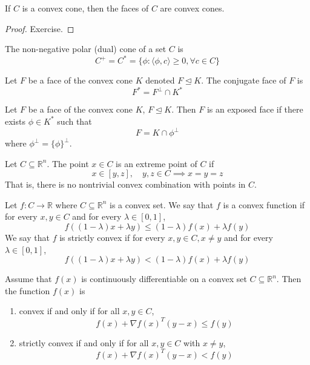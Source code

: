 \begin{theorem}[]
    If $C$ is a convex cone, then the faces of $C$ are convex cones.
\end{theorem}
\begin{proof}[Proof]
    Exercise.
\end{proof}
\begin{definition}
    The non-negative polar (dual) cone of a set $C$ is
    $$C^+ = C^* = \{\phi : \langle \phi, c \rangle \geq 0, \forall c \in C\}$$
\end{definition}
\begin{definition}
    Let $F$ be a face of the convex cone $K$ denoted $F \unlhd K$. The conjugate face of $F$ is $$F^* = F^\bot \cap K^*$$
\end{definition}
\begin{definition}
    Let $F$ be a face of the convex cone $K$, $F \unlhd K$. Then $F$ is an exposed face if there exists $\phi \in K^*$ such that
    $$F = K \cap \phi^\bot$$
    where $\phi^\bot = \{\phi\}^\bot$.
\end{definition}
\begin{definition}
    Let $C \subseteq \mathbb R^n$. The point $x \in C$ is an extreme point of $C$ if
    $$x \in [y,z], \quad y, z \in C \implies x = y = z$$
    That is, there is no nontrivial convex combination with points in $C$.
\end{definition}
\begin{definition}
    Let $f: C \to \mathbb R$ where $C \subseteq \mathbb R^n$ is a convex set. We say that $f$ is a convex function if for every $x, y \in C$ and for every $\lambda \in [0,1]$,
    $$f((1 - \lambda)x + \lambda y) \leq (1 - \lambda) f(x) + \lambda f(y)$$
    We say that $f$ is strictly convex if for every $x, y \in C, x \neq y$ and for every $\lambda \in [0,1]$,
    $$f((1 - \lambda)x + \lambda y) < (1 - \lambda) f(x) + \lambda f(y)$$
\end{definition}
\begin{theorem}
    Assume that $f(x)$ is continuously differentiable on a convex set $C \subseteq \mathbb R^n$. Then the function $f(x)$ is
    \begin{enumerate}
        \item convex if and only if for all $x, y \in C$, $$f(x) + \nabla f(x)^T (y - x) \leq f(y)$$
        \item strictly convex if and only if for all $x, y \in C$ with $x \neq y$,
        $$f(x) + \nabla f(x)^T (y - x) < f(y)$$
    \end{enumerate}
\end{theorem}
